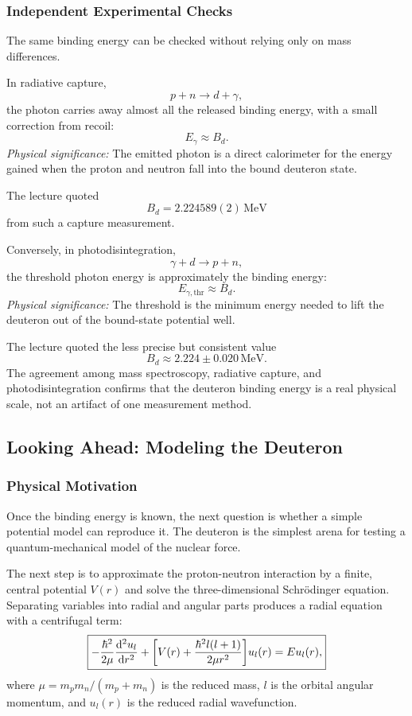\subsubsection*{Independent Experimental Checks}
The same binding energy can be checked without relying only on mass differences.

In radiative capture,
\[
  p+n\rightarrow d+\gamma,
\]
the photon carries away almost all the released binding energy, with a small correction from recoil:
\begin{equation}\label{eq:lec03:radiative_capture_energy}
  \boxed{
  E_\gamma \approx B_d.
  }
\end{equation}
\textit{Physical significance:} The emitted photon is a direct calorimeter for the energy gained when the proton and neutron fall into the bound deuteron state.

The lecture quoted
\[
  B_d = 2.224589(2)\,\mathrm{MeV}
\]
from such a capture measurement.

Conversely, in photodisintegration,
\[
  \gamma+d\rightarrow p+n,
\]
the threshold photon energy is approximately the binding energy:
\begin{equation}\label{eq:lec03:photodisintegration_threshold}
  \boxed{
  E_{\gamma,\mathrm{thr}}\approx B_d.
  }
\end{equation}
\textit{Physical significance:} The threshold is the minimum energy needed to lift the deuteron out of the bound-state potential well.

The lecture quoted the less precise but consistent value
\[
  B_d \approx 2.224\pm0.020\,\mathrm{MeV}.
\]
The agreement among mass spectroscopy, radiative capture, and photodisintegration confirms that the deuteron binding energy is a real physical scale, not an artifact of one measurement method.

\subsection*{Looking Ahead: Modeling the Deuteron}

\subsubsection*{Physical Motivation}
Once the binding energy is known, the next question is whether a simple potential model can reproduce it.  The deuteron is the simplest arena for testing a quantum-mechanical model of the nuclear force.

The next step is to approximate the proton-neutron interaction by a finite, central potential $V(r)$ and solve the three-dimensional Schrödinger equation.  Separating variables into radial and angular parts produces a radial equation with a centrifugal term:
\begin{equation}\label{eq:lec03:radial_schrodinger_preview}
  \boxed{
  -\frac{\hbar^2}{2\mu}\dv[2]{u_l}{r}
  +\qty[
  V(r)+\frac{\hbar^2 l(l+1)}{2\mu r^2}
  ]u_l(r)
  =Eu_l(r),
  }
\end{equation}
where $\mu=m_pm_n/(m_p+m_n)$ is the reduced mass, $l$ is the orbital angular momentum, and $u_l(r)$ is the reduced radial wavefunction.

